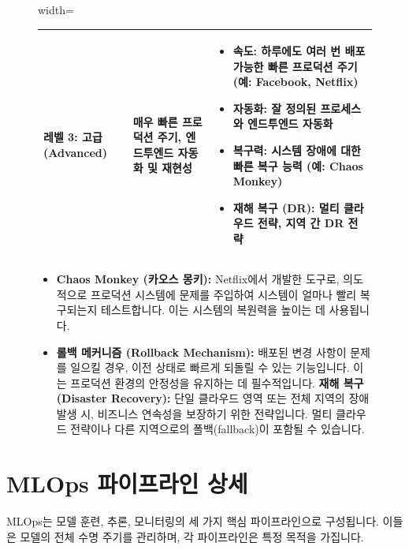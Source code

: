 \documentclass[11pt,a4paper]{article}
\theoremstyle{definition}
\begin{document}
\begin{figure}[h!]
\begin{adjustbox}{width=\textwidth}
\begin{tabular}{p{} | p{} | p{}}
    \midrule
    \textbf{레벨 3: 고급 (Advanced)} & 매우 빠른 프로덕션 주기, 엔드투엔드 자동화 및 재현성 &
    \begin{itemize}
        \item \textbf{속도:} 하루에도 여러 번 배포 가능한 빠른 프로덕션 주기 (예: Facebook, Netflix)
        \item \textbf{자동화:} 잘 정의된 프로세스와 엔드투엔드 자동화
        \item \textbf{복구력:} 시스템 장애에 대한 빠른 복구 능력 (예: Chaos Monkey)
        \item \textbf{재해 복구 (DR):} 멀티 클라우드 전략, 지역 간 DR 전략
    \end{itemize} \\
    \bottomrule
    \end{tabular}
    \end{adjustbox}
    \vspace{1em}
    \begin{itemize}
        \item \textbf{Chaos Monkey (카오스 몽키):} Netflix에서 개발한 도구로, 의도적으로 프로덕션 시스템에 문제를 주입하여 시스템이 얼마나 빨리 복구되는지 테스트합니다. 이는 시스템의 복원력을 높이는 데 사용됩니다.
        \item \textbf{롤백 메커니즘 (Rollback Mechanism):} 배포된 변경 사항이 문제를 일으킬 경우, 이전 상태로 빠르게 되돌릴 수 있는 기능입니다. 이는 프로덕션 환경의 안정성을 유지하는 데 필수적입니다.
        \textbf{재해 복구 (Disaster Recovery):} 단일 클라우드 영역 또는 전체 지역의 장애 발생 시, 비즈니스 연속성을 보장하기 위한 전략입니다. 멀티 클라우드 전략이나 다른 지역으로의 폴백(fallback)이 포함될 수 있습니다.
    \end{itemize}
\end{figure}

\newpage
\section{MLOps 파이프라인 상세}

MLOps는 모델 훈련, 추론, 모니터링의 세 가지 핵심 파이프라인으로 구성됩니다. 이들은 모델의 전체 수명 주기를 관리하며, 각 파이프라인은 특정 목적을 가집니다.
\end{document}
